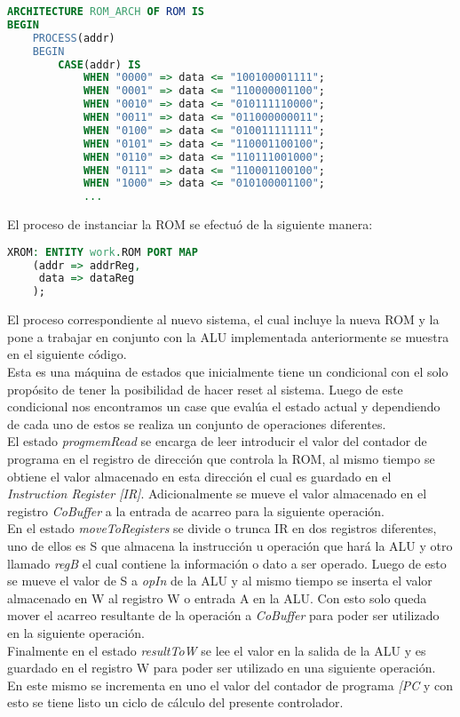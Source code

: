 \documentclass[12pt, letterpaper]{IEEEtran}
\begin{document}
\begin{lstlisting}[language=VHDL]
ARCHITECTURE ROM_ARCH OF ROM IS
BEGIN
	PROCESS(addr)
	BEGIN
		CASE(addr) IS
			WHEN "0000" => data <= "100100001111";
			WHEN "0001" => data <= "110000001100";
			WHEN "0010" => data <= "010111110000";
			WHEN "0011" => data <= "011000000011";
			WHEN "0100" => data <= "010011111111";
			WHEN "0101" => data <= "110001100100";
			WHEN "0110" => data <= "110111001000";
			WHEN "0111" => data <= "110001100100";
			WHEN "1000" => data <= "010100001100";
			...
\end{lstlisting}

\indent El proceso de instanciar la ROM se efectuó de la siguiente manera:\\

\begin{lstlisting}[language=VHDL]
XROM: ENTITY work.ROM PORT MAP
	(addr => addrReg,
	 data => dataReg
	);
\end{lstlisting}

\indent El proceso correspondiente al nuevo sistema, el cual incluye la nueva ROM y la pone a trabajar en conjunto con la ALU implementada anteriormente se muestra en el siguiente código.\\
\indent Esta es una máquina de estados que inicialmente tiene un condicional con el solo propósito de tener la posibilidad de hacer reset al sistema. Luego de este condicional nos encontramos un case que evalúa el estado actual y dependiendo de cada uno de estos se realiza un conjunto de operaciones diferentes.\\
\indent El estado \textit{progmemRead} se encarga de leer introducir el valor del contador de programa en el registro de dirección que controla la ROM, al mismo tiempo se obtiene el valor almacenado en esta dirección el cual es guardado en el \textit{Instruction Register [IR]}. Adicionalmente se mueve el valor almacenado en el registro \textit{CoBuffer} a la entrada de acarreo para la siguiente operación.\\
\indent En el estado \textit{moveToRegisters} se divide o trunca IR en dos registros diferentes, uno de ellos es S que almacena la instrucción u operación que hará la ALU y otro llamado \textit{regB} el cual contiene la información o dato a ser operado. Luego de esto se mueve el valor de S a \textit{opIn} de la ALU y al mismo tiempo se inserta el valor almacenado en W al registro W o entrada A en la ALU. Con esto solo queda mover el acarreo resultante de la operación a \textit{CoBuffer} para poder ser utilizado en la siguiente operación.\\
\indent Finalmente en el estado \textit{resultToW} se lee el valor en la salida de la ALU y es guardado en el registro W para poder ser utilizado en una siguiente operación. En este mismo se incrementa en uno el valor del contador de programa \textit{[PC} y con esto se tiene listo un ciclo de cálculo del presente controlador.\\
\end{document}
